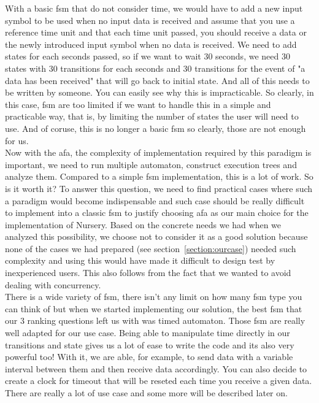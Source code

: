 \documentclass[12pt]{article}
\theoremstyle{definition}
\theoremstyle{definition}
\theoremstyle{remark}
\begin{document}
With a basic \gls{fsm} that do not consider time, we would have to add a new input symbol to be used when no input data is received and assume that you use a reference time unit and that each time unit passed, you should receive a data or the newly introduced input symbol when no data is received. We need to add states for each seconds passed, so if we want to wait 30 seconds, we need 30 states with 30 transitions for each seconds and 30 transitions for the event of "a data has been received" that will go back to initial state. And all of this needs to be written by someone. You can easily see why this is impracticable. So clearly, in this case, \gls{fsm} are too limited if we want to handle this in a simple and practicable way, that is, by limiting the number of states the user will need to use. And of coruse, this is no longer a basic \gls{fsm} so clearly, those are not enough for us.\\

Now with the \gls{afa}, the complexity of implementation required by this paradigm is important, we need to run multiple automaton, construct execution trees and analyze them. Compared to a simple \gls{fsm} implementation, this is a lot of work. So is it worth it? To answer this question, we need to find practical cases where such a paradigm would become indispensable and such case should be really difficult to implement into a classic \gls{fsm} to justify choosing \gls{afa} as our main choice for the implementation of Nursery. Based on the concrete needs we had when we analyzed this possibility, we choose not to consider it as a good solution because none of the cases we had prepared (see section~\ref{section:ourcase}) needed such complexity and using this would have made it difficult to design test by inexperienced users. This also follows from the fact that we wanted to avoid dealing with concurrency.\\

There is a wide variety of \gls{fsm}, there isn't any limit on how many \gls{fsm} type you can think of but when we started implementing our solution, the best \gls{fsm} that our 3 ranking questions left us with was timed automaton. Those \gls{fsm} are really well adapted for our use case. Being able to manipulate time directly in our transitions and state gives us a lot of ease to write the code and its also very powerful too! With it, we are able, for example, to send data with a variable interval between them and then receive data accordingly. You can also decide to create a clock for timeout that will be reseted each time you receive a given data. There are really a lot of use case and some more will be described later on.\\
\end{document}
